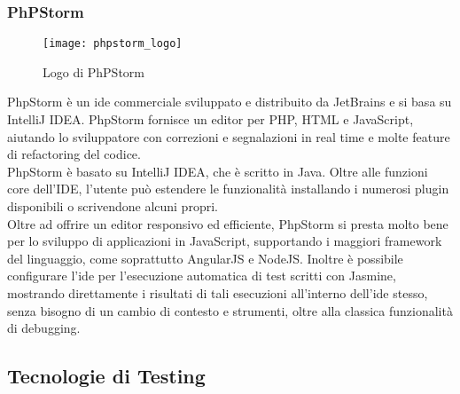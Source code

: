 \subsubsection{PhPStorm}
\begin{figure}[htb] 
    \centering 
    \texttt{[image: phpstorm\_logo]} 
    \caption{Logo di PhPStorm}
\end{figure}
PhpStorm è un \gls{ide} commerciale sviluppato e distribuito da JetBrains e si basa su IntelliJ IDEA.
PhpStorm fornisce un editor per PHP, HTML e JavaScript, aiutando lo sviluppatore con correzioni e segnalazioni in real time e molte feature di refactoring del codice.\\
PhpStorm è basato su IntelliJ IDEA, che è scritto in Java. Oltre alle funzioni core dell’IDE, l’utente può estendere le funzionalità installando i numerosi plugin disponibili o scrivendone alcuni propri.\\
Oltre ad offrire un editor responsivo ed efficiente, PhpStorm si presta molto bene per lo sviluppo di applicazioni in JavaScript, supportando i maggiori framework del linguaggio, come soprattutto AngularJS e NodeJS. 
Inoltre è possibile configurare l’\gls{ide} per l’esecuzione automatica di test scritti con Jasmine, mostrando direttamente i risultati di tali esecuzioni all’interno dell’\gls{ide} stesso, senza bisogno di un cambio di contesto e strumenti, oltre alla classica funzionalità di debugging.

\subsection{Tecnologie di Testing}
